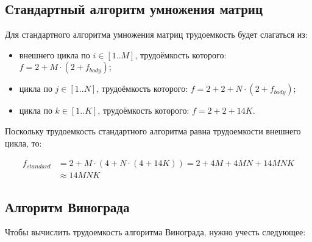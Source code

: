 \subsection{Стандартный алгоритм умножения матриц}

Для стандартного алгоритма умножения матриц трудоемкость будет слагаться из:

\begin{itemize}
	\item внешнего цикла по $i \in [1..M]$, трудоёмкость которого: $f = 2 + M \cdot (2 + f_{body})$;
	\item цикла по $j \in [1..N]$, трудоёмкость которого: $f = 2 + 2 + N \cdot (2 + f_{body})$;
	\item цикла по $k \in [1..K]$, трудоёмкость которого: $f = 2 + 2 + 14K$. \newline
\end{itemize}

Поскольку трудоемкость стандартного алгоритма равна трудоемкости внешнего цикла, то:

\begin{align}
	\label{for:standard}
	f_{standard} &= 2 + M \cdot (4 + N \cdot (4 + 14K)) = 2 + 4M + 4MN + 14MNK\\ &\approx 14MNK
\end{align}


\subsection{Алгоритм Винограда}

Чтобы вычислить трудоемкость алгоритма Винограда, нужно учесть следующее:

